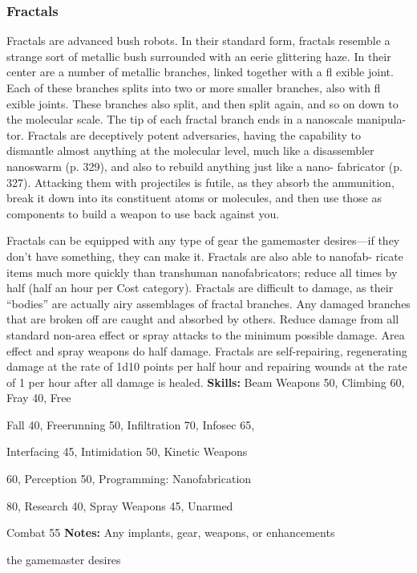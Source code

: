 \subsubsection{Fractals }

Fractals are advanced bush robots. In their standard 
form, fractals resemble a strange sort of metallic 
bush surrounded with an eerie glittering haze. In 
their center are a number of metallic branches, linked 
together with a fl exible joint. Each of these branches 
splits into two or more smaller branches, also with 
fl exible joints. These branches also split, and then split 
again, and so on down to the molecular scale. The tip 
of each fractal branch ends in a nanoscale manipula-
tor. Fractals are deceptively potent adversaries, having 
the capability to dismantle almost anything at the 
molecular level, much like a disassembler nanoswarm 
(p. 329), and also to rebuild anything just like a nano-
fabricator (p. 327). Attacking them with projectiles is 
futile, as they absorb the ammunition, break it down 
into its constituent atoms or molecules, and then use 
those as components to build a weapon to use back 
against you.

Fractals can be equipped with any type of gear the 
gamemaster desires—if they don't have something, 
they can make it. Fractals are also able to nanofab-
ricate items much more quickly than transhuman 
nanofabricators; reduce all times by half (half an hour 
per Cost category). Fractals are difficult to damage, as 
their ``bodies'' are actually airy assemblages of fractal 
branches. Any damaged branches that are broken off 
are caught and absorbed by others. Reduce damage 
from all standard non-area effect or spray attacks to 
the minimum possible damage. Area effect and spray 
weapons do half damage. Fractals are self-repairing, 
regenerating damage at the rate of 1d10 points per 
half hour and repairing wounds at the rate of 1 per 
hour after all damage is healed.
\textbf{Skills:} Beam Weapons 50, Climbing 60, Fray 40, Free 

Fall 40, Freerunning 50, Infiltration 70, Infosec 65, 

Interfacing 45, Intimidation 50, Kinetic Weapons 

60, Perception 50, Programming: Nanofabrication 

80, Research 40, Spray Weapons 45, Unarmed 

Combat 55
\textbf{Notes:} Any implants, gear, weapons, or enhancements 

the gamemaster desires

